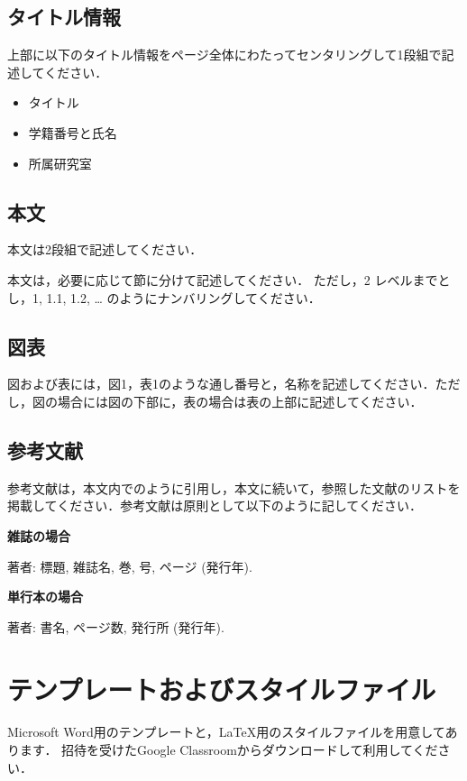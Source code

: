 \documentclass[a4paper, 9pt]{jarticle}
\begin{document}
\begin{論文概要}
\subsection{タイトル情報}
上部に以下のタイトル情報をページ全体にわたってセンタリングして1段組で記述してください．

\begin{itemize}
\item タイトル
\item 学籍番号と氏名
\item 所属研究室
\end{itemize}

\subsection{本文}
本文は2段組で記述してください．

本文は，必要に応じて節に分けて記述してください．
ただし，2 レベルまでとし，1, 1.1, 1.2, … のようにナンバリングしてください．

\subsection{図表}
図および表には，図1，表1のような通し番号と，名称を記述してください．ただし，図の場合には図の下部に，表の場合は表の上部に記述してください．

\subsection{参考文献}
参考文献は，本文内で\cite{paper1}\cite{paper2}のように引用し，本文に続いて，参照した文献のリストを掲載してください．参考文献は原則として以下のように記してください．

\begin{newenumerate}

\item {\bf 雑誌の場合}

著者: 標題, 雑誌名, 巻, 号, ページ (発行年).

\item {\bf 単行本の場合}

著者: 書名, ページ数, 発行所 (発行年).

\end{newenumerate}

\section{テンプレートおよびスタイルファイル}
Microsoft Word用のテンプレートと，\LaTeX 用のスタイルファイルを用意してあります．
招待を受けたGoogle Classroomからダウンロードして利用してください．


\end{論文概要}
\end{document}
